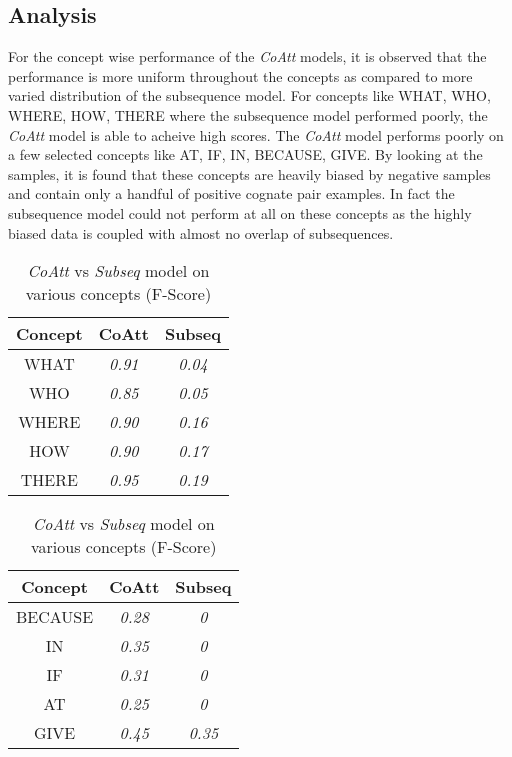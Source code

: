 \subsection{Analysis}

For the concept wise performance of the \textit{CoAtt} models, it is observed that the performance is more uniform throughout the concepts as compared to more varied distribution of the subsequence model. For concepts like WHAT, WHO, WHERE, HOW, THERE where the subsequence model performed poorly, the \textit{CoAtt} model is able to acheive high scores. The \textit{CoAtt} model performs poorly on a few selected concepts like AT, IF, IN, BECAUSE, GIVE. By looking at the samples, it is found that these concepts are heavily biased by negative samples and contain only a handful of positive cognate pair examples. In fact the subsequence model could not perform at all on these concepts as the highly biased data is coupled with almost no overlap of subsequences.

\begin{table}[h]
\centering
	\begin{minipage}{.5\linewidth}
      \centering

\begin{tabular}{ccc}
\textbf{Concept} & \textbf{CoAtt} & \textbf{Subseq} \\ \hline
WHAT             & \textit{0.91}  & \textit{0.04}   \\
WHO              & \textit{0.85}  & \textit{0.05}   \\
WHERE            & \textit{0.90}  & \textit{0.16}   \\
HOW              & \textit{0.90}  & \textit{0.17}   \\
THERE            & \textit{0.95}  & \textit{0.19}  
\end{tabular}


	\end{minipage}%
    \begin{minipage}{.5\linewidth}
    \centering

\begin{tabular}{ccc}
\textbf{Concept} & \textbf{CoAtt} & \textbf{Subseq} \\ \hline
BECAUSE          & \textit{0.28}  & \textit{0}      \\
IN               & \textit{0.35}  & \textit{0}      \\
IF               & \textit{0.31}  & \textit{0}      \\
AT               & \textit{0.25}  & \textit{0}      \\
GIVE             & \textit{0.45}  & \textit{0.35}  
\end{tabular}

	\end{minipage} 
\caption{\textit{CoAtt} vs \textit{Subseq} model on various concepts (F-Score)}
\end{table}

